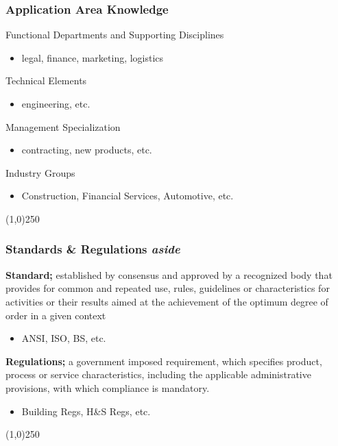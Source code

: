 \begin{frame}
\frametitle{Application Area Knowledge}
Functional Departments and Supporting Disciplines \\
	\begin{itemize}
	\item legal, finance, marketing, logistics
	\end{itemize}
Technical Elements \\
	\begin{itemize}
	\item engineering, etc.
	\end{itemize}
Management Specialization \\
	\begin{itemize}
	\item contracting, new products, etc.
	\end{itemize}
Industry Groups \\
	\begin{itemize}
	\item Construction, Financial Services, Automotive, etc.
	\end{itemize}
\end{frame}
\begin{center}\line(1,0){250}\end{center}



\begin{frame}
\frametitle{Standards \& Regulations \hfill \textit{aside}}
\textbf{Standard;} established by consensus and approved by a recognized body that provides for common and repeated use, rules, guidelines or characteristics for activities or their results aimed at the achievement of the optimum degree of order in a given context\\
\begin{itemize}
\item ANSI, ISO, BS, etc.
\end{itemize}

\textbf{Regulations;} a government imposed requirement, which specifies product, process or service characteristics, including the applicable administrative provisions, with which compliance is mandatory.\\
\begin{itemize}
\item Building Regs, H\&S Regs, etc. 
\end{itemize}
\end{frame}
\begin{center}\line(1,0){250}\end{center}


